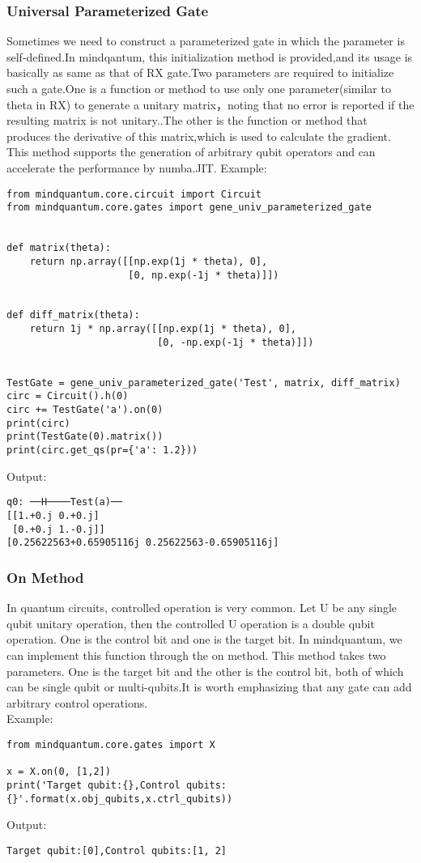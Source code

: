 \subsubsection{Universal Parameterized Gate}
Sometimes we need to construct a parameterized gate in which the parameter is self-defined.In mindqantum, this initialization method is provided,and its usage is basically as same as that of RX gate.Two parameters are required to initialize such a gate.One is a function or method to use only one parameter(similar to theta in RX) to generate a unitary matrix，noting that no error is reported if the resulting matrix is not unitary..The other is the function or method that produces the derivative of this matrix,which is used to calculate the gradient. This method supports the generation of arbitrary qubit operators and can accelerate the performance by numba.JIT.
Example:
\begin{lstlisting}
from mindquantum.core.circuit import Circuit
from mindquantum.core.gates import gene_univ_parameterized_gate


def matrix(theta):
    return np.array([[np.exp(1j * theta), 0],
                     [0, np.exp(-1j * theta)]])


def diff_matrix(theta):
    return 1j * np.array([[np.exp(1j * theta), 0],
                          [0, -np.exp(-1j * theta)]])


TestGate = gene_univ_parameterized_gate('Test', matrix, diff_matrix)
circ = Circuit().h(0)
circ += TestGate('a').on(0)
print(circ)
print(TestGate(0).matrix())
print(circ.get_qs(pr={'a': 1.2}))
\end{lstlisting}
Output:
\begin{lstlisting}
q0: ──H────Test(a)──
[[1.+0.j 0.+0.j]
 [0.+0.j 1.-0.j]]
[0.25622563+0.65905116j 0.25622563-0.65905116j]
\end{lstlisting}

\subsubsection{On Method}
In quantum circuits, controlled operation is very common. Let U be any single qubit unitary operation, then the controlled U operation is a double qubit operation. One is the control bit and one is the target bit. In mindquantum, we can implement this function through the on method. This method takes two parameters. One is the target bit and the other is the control bit, both of which can be single qubit or multi-qubits.It is worth emphasizing that any gate can add arbitrary control operations.\\
Example:
\begin{lstlisting}
from mindquantum.core.gates import X

x = X.on(0, [1,2])
print('Target qubit:{},Control qubits:{}'.format(x.obj_qubits,x.ctrl_qubits))
\end{lstlisting}
Output:
\begin{lstlisting}
Target qubit:[0],Control qubits:[1, 2]
\end{lstlisting}

